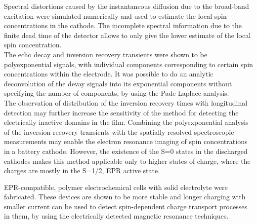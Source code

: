 Spectral distortions caused by the instantaneous diffusion due to the broad-band excitation were simulated numerically and used to estimate the local spin concentrations in the cathode. The incomplete spectral information due to the finite dead time of the detector allows to only give the lower estimate of the local spin concentration.\\

The echo decay and inversion recovery transients were shown to be polyexponential signals, with individual components corresponding to certain spin concentrations within the electrode. It was possible to do an analytic deconvolution of the devay signals into its exponential components without specifying the number of components, by using the Pade-Laplace analysis.\\

The observation of distribution of the inversion recovery times with longitudinal detection may further increase the sensitivity of the method for detecting the electrically inactive domains in the film. Combining the polyexponential analysis of the inversion recovery transients with the spatially resolved spectroscopic measurements may enable the electron resonance imaging of spin concentrations in a battery cathode. However, the existence of the S=0 states in the discharged cathodes makes this method applicable only to higher states of charge, where the charges are mostly in the S=1/2, EPR active state.


EPR-compatible, polymer electrochemical cells with solid electrolyte were fabricated. These devices are shown to be more stable and longer charging with smaller current can be used to detect spin-dependent charge transport processes in them, by using the electrically detected magnetic resonance techniques.\\






